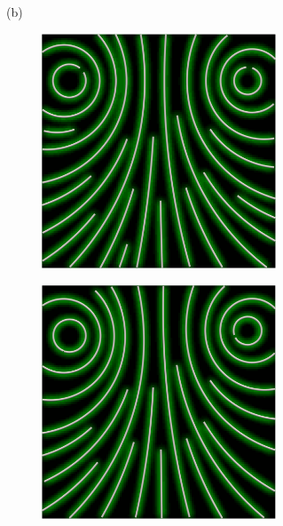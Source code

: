 \begin{figure}[ht]
\begin{subfigure}{\textwidth}
\begin{subfigure}{.19\textwidth}
        \end{subfigure}
        \caption*{(b)}
    \end{subfigure}
    \begin{subfigure}{\textwidth}
        \begin{subfigure}{.19\textwidth}
            \centering
            \includegraphics[scale=.055]{figures/AlphaStudy/Gyro23C.0000.png}
        \end{subfigure}
        \begin{subfigure}{.19\textwidth}
            \centering
            \includegraphics[scale=.055]{figures/AlphaStudy/Gyro23C.0001.png}

\end{subfigure}
\end{subfigure}
\end{figure}
